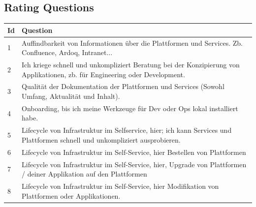 \documentclass[a4paper,12pt]{article}
\begin{document}
    \subsection{Rating Questions}
    \label{subsec:rating}
    \begin{table}[!htbp]
        \begin{center}
            \begin{tabularx}{\textwidth}{lX}
                \toprule
                Id & Question                                                                                                                                                                              \\
                \midrule
                1  & Auffindbarkeit von Informationen über die Plattformen und Services. Zb. Confluence, Ardoq, Intranet...                                                                                \\
                2  & Ich kriege schnell und unkompliziert Beratung bei der Konzipierung von Applikationen, zb. für Engineering oder Development.                                                           \\
                3  & Qualität der Dokumentation der Plattformen und Services (Sowohl Umfang, Aktualität und Inhalt).                                                                                       \\
                4  & Onboarding, bis ich meine Werkzeuge für Dev oder Ops lokal installiert habe.                                                                                                          \\
                5  & Lifecycle von Infrastruktur im Selfservice, hier; ich kann Services und Plattformen schnell und unkompliziert ausprobieren.                                                           \\
                6  & Lifecycle von Infrastruktur im Self-Service, hier Bestellen von Plattformen                                                                                                           \\
                7  & Lifecycle von Infrastruktur im Self-Service, hier, Upgrade von Plattformen / deiner Applikation auf den Plattformen                                                                   \\
                8  & Lifecycle von Infrastruktur im Self-Service, hier Modifikation von Plattformen oder Applikationen.                                                                                    \\

\end{tabularx}
\end{center}
\end{table}
\end{document}
